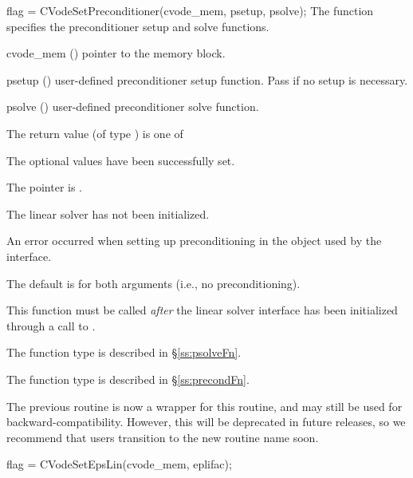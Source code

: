 {
  flag = CVodeSetPreconditioner(cvode\_mem, psetup, psolve);
}
{
  The function  specifies the preconditioner
  setup and solve functions.
}
{
  \begin{args}
  \item[cvode\_mem] ()
    pointer to the {\cvode} memory block.
  \item[psetup] ()
    user-defined preconditioner setup function.
    Pass  if no setup is necessary.
  \item[psolve] ()
    user-defined preconditioner solve function.
  \end{args}
}
{
  The return value  (of type ) is one of
  \begin{args}
  \item[\Id{CVLS\_SUCCESS}]
    The optional values have been successfully set.
  \item[\Id{CVLS\_MEM\_NULL}]
    The  pointer is .
  \item[\Id{CVLS\_LMEM\_NULL}]
    The {\cvls} linear solver has not been initialized.
  \item[\Id{CVLS\_SUNLS\_FAIL}]
    An error occurred when setting up preconditioning in the
    {\sunlinsol} object used by the {\cvls} interface.
  \end{args}
}
{
  The default is  for both arguments (i.e., no
  preconditioning).

  This function must be called \emph{after} the {\cvls} linear solver
  interface has been initialized through a call to
  .

  The function type  is described in \S\ref{ss:psolveFn}.

  The function type  is described in \S\ref{ss:precondFn}.

  The previous routine  is now a wrapper
  for this routine, and may still be used for backward-compatibility.
  However, this will be deprecated in future releases, so we recommend
  that users transition to the new routine name soon.
}
{
  flag = CVodeSetEpsLin(cvode\_mem, eplifac);
}

